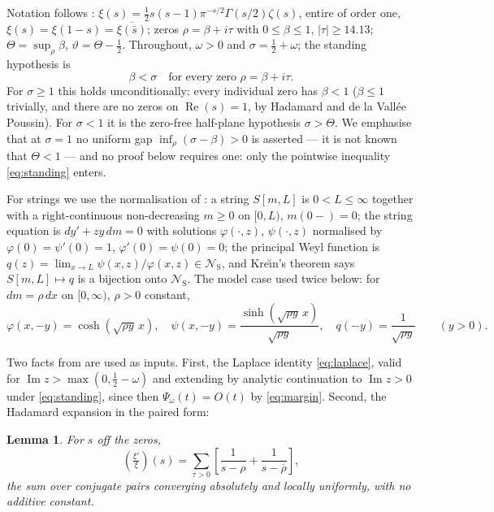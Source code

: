 \documentclass[11pt,reqno]{amsart}
\theoremstyle{plain}
\newtheorem{lemma}[theorem]{Lemma}
\theoremstyle{definition}
\newcommand{\Rp}{\operatorname{Re}}
\newcommand{\Ip}{\operatorname{Im}}
\newcommand{\lxi}[1]{\left(\tfrac{\xi'}{\xi}\right)\!#1}
\newcommand{\NS}{\mathcal N_{\mathrm S}}
\begin{document}
Notation follows \cite{Suzuki2023,Margin}: $\xi(s)=\tfrac12s(s-1)\pi^{-s/2}\Gamma(s/2)\zeta(s)$,
entire of order one, $\xi(s)=\xi(1-s)=\overline{\xi(\bar s)}$; zeros $\rho=\beta+i\tau$ with
$0\le\beta\le1$, $|\tau|\ge14.13$; $\Theta=\sup_\rho\beta$, $\vartheta=\Theta-\tfrac12$.
Throughout, $\omega>0$ and $\sigma=\tfrac12+\omega$; the standing hypothesis is
\begin{equation}\label{eq:standing}
  \beta<\sigma\quad\text{for every zero }\rho=\beta+i\tau .
\end{equation}
For $\sigma\ge1$ this holds unconditionally: every individual zero has $\beta<1$ ($\beta\le1$
trivially, and there are no zeros on $\Rp(s)=1$, by Hadamard and de la Vall\'ee Poussin). For
$\sigma<1$ it is the zero-free half-plane hypothesis $\sigma>\Theta$. We emphasise that at
$\sigma=1$ no uniform gap $\inf_\rho(\sigma-\beta)>0$ is asserted --- it is not known that
$\Theta<1$ --- and no proof below requires one: only the pointwise inequality
\eqref{eq:standing} enters.

For strings we use the normalisation of \cite[\S9]{Suzuki2023}: a string $S[m,L]$ is
$0<L\le\infty$ together with a right-continuous non-decreasing $m\ge0$ on $[0,L)$,
$m(0-)=0$; the string equation is $dy'+zy\,dm=0$ with solutions $\varphi(\cdot,z)$,
$\psi(\cdot,z)$ normalised by $\varphi(0)=\psi'(0)=1$, $\varphi'(0)=\psi(0)=0$; the principal
Weyl function is $q(z)=\lim_{x\to L}\psi(x,z)/\varphi(x,z)\in\NS$, and Kre\u\i n's theorem
\cite{Krein1952,KacKrein} says $S[m,L]\mapsto q$ is a bijection onto $\NS$. The model case used
twice below: for $dm=\rho\,dx$ on $[0,\infty)$, $\rho>0$ constant,
\begin{equation}\label{eq:homog}
  \varphi(x,-y)=\cosh(\sqrt{\rho y}\,x),\quad
  \psi(x,-y)=\frac{\sinh(\sqrt{\rho y}\,x)}{\sqrt{\rho y}},\quad
  q(-y)=\frac1{\sqrt{\rho y}}\qquad(y>0).
\end{equation}

Two facts from \cite{Suzuki2023,Margin} are used as inputs. First, the Laplace identity
\eqref{eq:laplace}, valid for $\Ip z>\max(0,\tfrac12-\omega)$ and extending by analytic
continuation to $\Ip z>0$ under \eqref{eq:standing}, since then $\Psi_\omega(t)=O(t)$ by
\eqref{eq:margin}. Second, the Hadamard expansion in the paired form:

\begin{lemma}\label{lem:hadamard}
For $s$ off the zeros,
\[
  \lxi{(s)}=\sum_{\tau>0}\left[\frac1{s-\rho}+\frac1{s-\overline\rho}\right],
\]
the sum over conjugate pairs converging absolutely and locally uniformly, with \emph{no}
additive constant.
\end{lemma}
\end{document}
